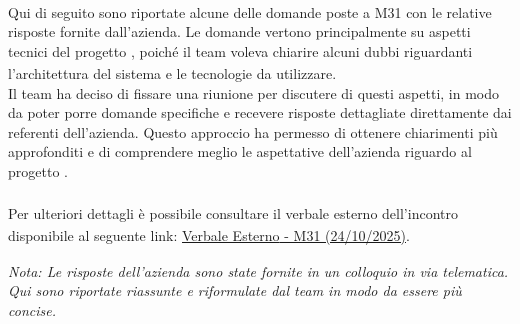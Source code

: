 \documentclass[a4paper,11pt]{article}
\begin{document}
\paragraph{}
Qui di seguito sono riportate alcune delle domande poste a M31 con le relative risposte fornite dall'azienda. Le domande vertono principalmente su aspetti tecnici del progetto\textsubscript{}
, poiché il team voleva chiarire alcuni dubbi riguardanti l'architettura del sistema e le tecnologie da utilizzare. \\
Il team ha deciso di fissare una riunione per discutere di questi aspetti, in modo da poter porre domande specifiche e recevere risposte dettagliate direttamente dai referenti dell'azienda. Questo approccio ha permesso di ottenere chiarimenti più approfonditi e di comprendere meglio le aspettative dell'azienda riguardo al progetto\textsubscript{}
.\\\\
Per ulteriori dettagli è possibile consultare il verbale esterno\textsubscript{} dell'incontro disponibile al seguente link: \href{https://bugbustersunipd.github.io/DocumentazioneSWE/CANDIDATURA/VERBALI/Esterni/VE_2025-10-24%20%5BM31%5D/VE_2025-10-24%5BM31%5D.pdf}{Verbale Esterno\textsubscript{\scalebox{0.6}{\textbf{G}}} - M31 (24/10/2025)}.

\begin{center}
\small\textit{Nota: Le risposte dell'azienda sono state fornite in un colloquio in via telematica. Qui sono riportate riassunte e riformulate dal team in modo da essere più concise.}
\end{center}
\end{document}
